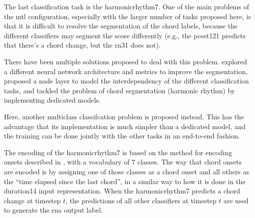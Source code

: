 
The last classification task is the \gls{harmonicrhythm7}.
One of the main problems of the \gls{mtl} configuration,
especially with the larger number of tasks proposed here, is
that it is difficult to resolve the segmentation of the
chord labels, because the different classifiers may segment
the score differently (e.g., the \gls{pcset121} predicts
that there's a chord change, but the \gls{rn31} does not).

There have been multiple solutions proposed to deal with
this problem. \textcite{chen2021attend} explored a different
neural network architecture and metrics to improve the
segmentation, \textcite{micchi2021deep} proposed a
\gls{nade} layer to model the interdependency of the
different classification tasks, \textcite{mcleod2021modular}
and  \textcite{wu2021melody} tackled the problem of chord
segmentation (harmonic rhythm) by implementing dedicated
models. 

Here, another multiclass classifcation problem is proposed
instead. This has the advantage that its implementation is
much simpler than a dedicated model, and the training can be
done jointly with the other tasks in an end-to-end fashion.

The encoding of the \gls{harmonicrhythm7} is based on the
method for encoding onsets described in
, with a
vocabulary of 7 classes. The way that chord onsets are
encoded is by assigning one of those classes as a chord
onset and all others as the ``time elapsed since the last
chord'', in a similar way to how it is done in the
\gls{duration14} input representation. When the
\gls{harmonicrhythm7} predicts a chord change at timestep
$t$, the predictions of all other classifiers at timestep
$t$ are used to generate the \gls{rna} output label.
